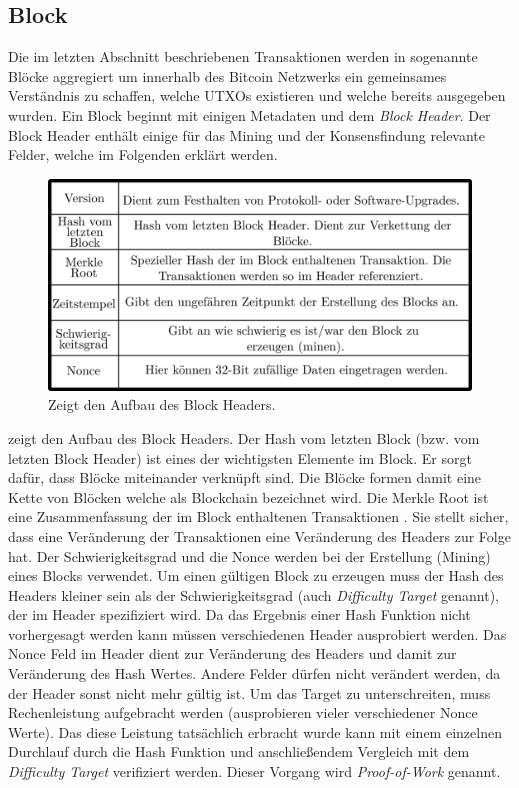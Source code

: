 \documentclass[ngerman,runningheads,a4paper]{llncs}[2018/03/10]
\begin{document}
\subsection{Block}\label{sec:block}

Die im letzten Abschnitt beschriebenen Transaktionen werden in sogenannte Blöcke aggregiert um innerhalb des Bitcoin Netzwerks ein gemeinsames Verständnis zu schaffen, welche UTXOs existieren und welche bereits ausgegeben wurden. Ein Block beginnt mit einigen Metadaten und dem \textit{Block Header}. Der Block Header enthält einige für das Mining und der Konsensfindung relevante Felder, welche im Folgenden erklärt werden.

\begin{figure}
  \centering
  \includegraphics[width=.8\textwidth]{grafiken/tableBlock.png}
  \caption{Zeigt den Aufbau des Block Headers.}
  \label{fig:blockTable}
\end{figure}

 zeigt den Aufbau des Block Headers. Der Hash vom letzten Block (bzw. vom letzten Block Header) ist eines der wichtigsten Elemente im Block. Er sorgt dafür, dass Blöcke miteinander verknüpft sind. Die Blöcke formen damit eine Kette von Blöcken welche als Blockchain bezeichnet wird. Die Merkle Root ist eine Zusammenfassung der im Block enthaltenen Transaktionen \citep{bitcoinbook}. Sie stellt sicher, dass eine Veränderung der Transaktionen eine Veränderung des Headers zur Folge hat. Der Schwierigkeitsgrad und die Nonce werden bei der Erstellung (Mining) eines Blocks verwendet. Um einen gültigen Block zu erzeugen muss der Hash des Headers kleiner sein als der Schwierigkeitsgrad (auch \textit{Difficulty Target} genannt), der im Header spezifiziert wird. Da das Ergebnis einer Hash Funktion nicht vorhergesagt werden kann müssen verschiedenen Header ausprobiert werden. Das Nonce Feld im Header dient zur Veränderung des Headers und damit zur Veränderung des Hash Wertes. Andere Felder dürfen nicht verändert werden, da der Header sonst nicht mehr gültig ist. Um das Target zu unterschreiten, muss Rechenleistung aufgebracht werden (ausprobieren vieler verschiedener Nonce Werte). Das diese Leistung tatsächlich erbracht wurde kann mit einem einzelnen Durchlauf durch die Hash Funktion und anschließendem Vergleich mit dem \textit{Difficulty Target} verifiziert werden. Dieser Vorgang wird \textit{Proof-of-Work} genannt.
\end{document}
